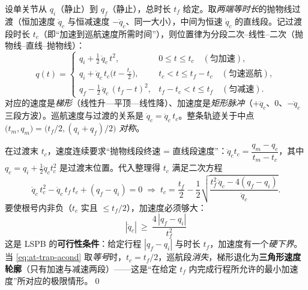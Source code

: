 \begin{definition}\label{def:at-trap}
设单关节从 $q_i$（静止）到 $q_f$（静止），总时长 $t_f$ 给定。取\emph{两端等时长}的抛物线过渡（恒加速度 $\ddot q_c$ 与恒减速度 $-\ddot q_c$、同一大小），中间为恒速 $\dot q_c$ 的直线段。记过渡段时长 $t_c$（即“加速到巡航速度所需时间”），则位置律为分段二次--线性--二次（抛物线--直线--抛物线）：
\begin{equation}
  q(t)=
  \begin{cases}
    q_i+\tfrac12\,\ddot q_c\,t^2, & 0\le t\le t_c\quad(\text{匀加速}),\\[3pt]
    q_i+\ddot q_c\,t_c\big(t-\tfrac{t_c}{2}\big), & t_c<t\le t_f-t_c\quad(\text{匀速巡航}),\\[3pt]
    q_f-\tfrac12\,\ddot q_c\,(t_f-t)^2, & t_f-t_c<t\le t_f\quad(\text{匀减速}).
  \end{cases}
  \label{eq:at-trap-q}
\end{equation}
对应的速度是\emph{梯形}（线性升—平顶—线性降）、加速度是\emph{矩形脉冲}（$+\ddot q_c$、$0$、$-\ddot q_c$ 三段方波）。巡航速度与过渡的关系是 $\dot q_c=\ddot q_c\,t_c$。整条轨迹关于中点 $\big(t_m,q_m\big)=\big(t_f/2,(q_i+q_f)/2\big)$ \emph{对称}。
\end{definition}

\begin{derivation}\label{der:at-trap-feasible}
在过渡末 $t_c$，速度连续要求“抛物线段终速 = 直线段速度”：$\ddot q_c t_c=\dfrac{q_m-q_c}{t_m-t_c}$，其中 $q_c=q_i+\tfrac12\ddot q_c t_c^2$ 是过渡末位置。代入整理得 $t_c$ 满足二次方程
\begin{equation}
  \ddot q_c\,t_c^2-\ddot q_c\,t_f\,t_c+(q_f-q_i)=0
  \;\Longrightarrow\;
  t_c=\frac{t_f}{2}-\frac12\sqrt{\frac{t_f^2\,\ddot q_c-4(q_f-q_i)}{\ddot q_c}}.
  \label{eq:at-trap-tc}
\end{equation}
要使根号内非负（$t_c$ 实且 $\le t_f/2$），加速度必须够大：
\begin{equation}
  \boxed{\;|\ddot q_c|\ \ge\ \frac{4\,|q_f-q_i|}{t_f^2}\;}
  \label{eq:at-trap-acond}
\end{equation}
这是 LSPB 的\textbf{可行性条件}：给定行程 $|q_f-q_i|$ 与时长 $t_f$，加速度有一个\emph{硬下界}。当 \cref{eq:at-trap-acond} 取\emph{等号}时，$t_c=t_f/2$，巡航段\emph{消失}，梯形退化为\textbf{三角形速度轮廓}（只有加速与减速两段）——这是“在给定 $t_f$ 内完成行程所允许的最小加速度”所对应的极限情形。\qed
\end{derivation}

